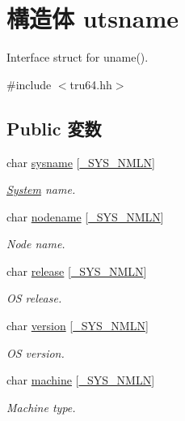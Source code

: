 \hypertarget{structTru64_1_1utsname}{
\section{構造体 utsname}
\label{structTru64_1_1utsname}
}


Interface struct for uname().  


{\ttfamily \#include $<$tru64.hh$>$}\subsection*{Public 変数}
\begin{DoxyCompactItemize}
\item 
char \hyperlink{structTru64_1_1utsname_a2deb62088193f0a1a1c7169961ef9417}{sysname} \mbox{[}\hyperlink{classTru64_a1a19d4c9718c9a4ad5fa2e48271fccc9}{\_\-SYS\_\-NMLN}\mbox{]}
\begin{DoxyCompactList}\small\item\em \hyperlink{classSystem}{System} name. \item\end{DoxyCompactList}\item 
char \hyperlink{structTru64_1_1utsname_a3e8872e682806e061de2b1ee07bc75f3}{nodename} \mbox{[}\hyperlink{classTru64_a1a19d4c9718c9a4ad5fa2e48271fccc9}{\_\-SYS\_\-NMLN}\mbox{]}
\begin{DoxyCompactList}\small\item\em Node name. \item\end{DoxyCompactList}\item 
char \hyperlink{structTru64_1_1utsname_a4015ecb9ca3fd601ff8b8961eda3e7e2}{release} \mbox{[}\hyperlink{classTru64_a1a19d4c9718c9a4ad5fa2e48271fccc9}{\_\-SYS\_\-NMLN}\mbox{]}
\begin{DoxyCompactList}\small\item\em OS release. \item\end{DoxyCompactList}\item 
char \hyperlink{structTru64_1_1utsname_a1e88526d3e96aa25d88df1541dafe922}{version} \mbox{[}\hyperlink{classTru64_a1a19d4c9718c9a4ad5fa2e48271fccc9}{\_\-SYS\_\-NMLN}\mbox{]}
\begin{DoxyCompactList}\small\item\em OS version. \item\end{DoxyCompactList}\item 
char \hyperlink{structTru64_1_1utsname_a0687759450f1b8396e8e9415abe4b867}{machine} \mbox{[}\hyperlink{classTru64_a1a19d4c9718c9a4ad5fa2e48271fccc9}{\_\-SYS\_\-NMLN}\mbox{]}
\begin{DoxyCompactList}\small\item\em Machine type. \item\end{DoxyCompactList}\end{DoxyCompactItemize}


